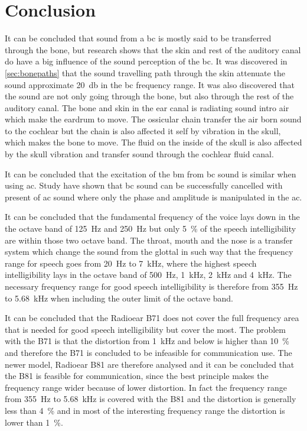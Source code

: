 \section{Conclusion}

It can be concluded that sound from a \gls{bc} is mostly said to be transferred through the bone, but research shows that the skin and rest of the auditory canal do have a big influence of the sound perception of the \gls{bc}. It was discovered in \autoref{sec:bonepaths} that the sound travelling path through the skin attenuate the sound approximate \SI{20}{\decibel} in the \gls{bc} frequency range. It was also discovered that the sound are not only going through the bone, but also through the rest of the auditory canal. The bone and skin in the ear canal is radiating sound intro air which make the eardrum to move. The ossicular chain transfer the air born sound to the cochlear but the chain is also affected it self by vibration in the skull, which makes the bone to move. The fluid on the inside of the skull is also affected by the skull vibration and transfer sound through the cochlear fluid canal.  

It can be concluded that the excitation of the \gls{bm} from \gls{bc} sound is similar when using \gls{ac}. Study have shown that \gls{bc} sound can be successfully cancelled with present of \gls{ac} sound where only the phase and amplitude is manipulated in the \gls{ac}. 

It can be concluded that the fundamental frequency of the voice lays down in the the octave band of \SI{125}{\hertz} and \SI{250}{\hertz} but only \SI{5}{\percent} of the speech intelligibility are within those two octave band. The throat, mouth and the nose is a transfer system which change the sound from the glottal in such way that the frequency range for speech goes from \SI{20}{\hertz} to \SI{7}{\kilo\hertz}, where the highest speech intelligibility lays in the octave band of \SI{500}{\hertz}, \SI{1}{\kilo\hertz}, \SI{2}{\kilo\hertz} and \SI{4}{\kilo\hertz}. The necessary frequency range for good speech intelligibility is therefore from \SI{355}{\hertz} to \SI{5.68}{\kilo\hertz} when including the outer limit of the octave band.

It can be concluded that the Radioear B71 does not cover the full frequency area that is needed for good speech intelligibility but cover the most. The problem with the B71 is that the distortion from \SI{1}{\kilo\hertz} and below is higher than \SI{10}{\percent} and therefore the B71 is concluded to be infeasible for communication use. The newer model, Radioear B81 are therefore analysed and it can be concluded that the B81 is feasible for communication, since the \gls{best} principle makes the frequency range wider because of lower distortion. In fact the frequency range from \SI{355}{\hertz} to \SI{5.68}{\kilo\hertz} is covered with the B81 and the distortion is generally less than \SI{4}{\percent} and in most of the interesting frequency range the distortion is lower than \SI{1}{\percent}.

